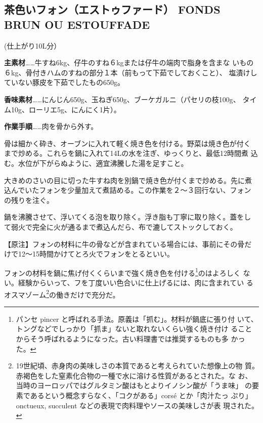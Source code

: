 \documentclass[twoside,12Q,b5paper]{escoffierltjsbook}
\newenvironment{recette}{\begin{multicols}{2}}{\end{multicols}}
\begin{document}
\begin{recette}

\subsection{茶色いフォン（エストゥファード） FONDS BRUN OU
ESTOUFFADE}\label{ux8336ux8272ux3044ux30d5ux30a9ux30f3ux30a8ux30b9ux30c8ux30a5ux30d5ux30a1ux30fcux30c9-fonds-brun-ou-estouffade}

(仕上がり10L分）

\textbf{主素材}\ldots{}\ldots{}牛すね6kg、仔牛のすね６kgまたは仔牛の端肉で脂身を含まな
いもの６kg、骨付きハムのすねの部分１本（前もって下茹でしておくこと）、
塩漬けしていない豚皮を下茹でしたもの650g。

\textbf{香味素材}\ldots{}\ldots{}にんじん650g、玉ねぎ650g、ブーケガルニ（パセリの枝100g、
タイム10g、ローリエ5g、にんにく1片）。

\textbf{作業手順}\ldots{}\ldots{}肉を骨から外す。

骨は細かく砕き、オーブンに入れて軽く焼き色を付ける。野菜は焼き色が付く
まで炒める。これらを鍋に入れて14Lの水を注ぎ、ゆっくりと、最低12時間煮
込む。水位が下がらぬように、適宜沸騰した湯を足すこと。

大きめのさいの目に切った牛すね肉を別鍋で焼き色が付くまで炒める。先に煮
込んでいたフォンを少量加えて煮詰める。この作業を２〜３回行ない、フォン
の残りを注ぐ。

鍋を沸騰させて、浮いてくる泡を取り除く。浮き脂も丁寧に取り除く。蓋をし
て弱火で完全に火が通るまで煮込んだら、布で漉してストックしておく。

【原注】フォンの材料に牛の骨などが含まれている場合には、事前にその骨だ
けで12〜15時間かけてとろ火でフォンをとるといい。

フォンの材料を鍋に焦げ付くくらいまで強く焼き色を付ける\footnote{パンセ
  pincer と呼ばれる手法。原義は「抓む」。材料が鍋底に張り付
  いて、トングなどでしっかり「抓ま」ないと取れないくらい強く焼き付け
  ることからそう呼ばれるようになった。古い料理書では推奨するものも多
  かった。}のはよろしく
ない。経験からいって、フを丁度いい色合いに仕上げるには、肉に含まれてい
るオスマゾーム\footnote{19世紀頃、赤身肉の美味しさの本質であると考えられていた想像上の物
  質。赤褐色をした窒素化合物の一種で水に溶ける性質があるとされた。な
  お、当時のヨーロッパではグルタミン酸はもとよりイノシン酸が「うま味」
  の要素であるという概念すらなく、「コクがある」corsé とか「肉汁たっ
  ぷり」onctueux, succulent などの表現で肉料理やソースの美味しさが表
  現された。}の働きだけで充分だ。


\end{recette}
\end{document}
